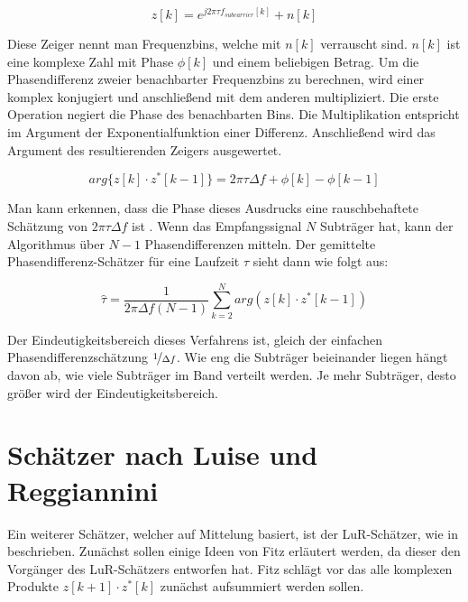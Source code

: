 \begin{equation}
	\label{Frequnzbin}
	z[k] = e^{j2\pi \tau f_{subcarrier}[k]} + n[k]
\end{equation}

Diese Zeiger nennt man Frequenzbins, welche mit $n[k]$ verrauscht sind. $n[k]$ ist eine komplexe Zahl mit Phase $\phi[k]$ und einem beliebigen Betrag. Um die Phasendifferenz zweier benachbarter Frequenzbins zu berechnen, wird einer komplex konjugiert und anschließend mit dem anderen multipliziert. Die erste Operation negiert die Phase des benachbarten Bins. Die Multiplikation entspricht im Argument der Exponentialfunktion einer Differenz. Anschließend wird das Argument des resultierenden Zeigers ausgewertet.

\begin{equation}
	\label{eq:Phasendiff Komplexer Zeiger}
	arg\{z[k]\cdot z^*[k-1]\} = 2 \pi \tau \Delta f + \phi [k] - \phi [k-1]
\end{equation}

Man kann erkennen, dass die Phase dieses Ausdrucks eine rauschbehaftete Schätzung von $2 \pi \tau \Delta f$ ist \cite[S.87]{mengali1997synchronization}. Wenn das Empfangssignal $N$ Subträger hat, kann der Algorithmus über $N - 1$ Phasendifferenzen mitteln. Der gemittelte Phasendifferenz-Schätzer für eine Laufzeit $\tau$ sieht dann wie folgt aus:

\begin{equation}
	\label{eq:gemittelte Phasendifferenz}
	\hat{\tau} = \frac{1}{2\pi \Delta f (N - 1)}\sum_{k = 2}^{N} arg(z[k]\cdot z^*[k-1])
\end{equation}

Der Eindeutigkeitsbereich dieses Verfahrens ist, gleich der einfachen Phasendifferenzschätzung $\nicefrac[]{1}{\Delta f}$. Wie eng die Subträger beieinander liegen hängt davon ab, wie viele Subträger im Band verteilt werden. Je mehr Subträger, desto größer wird der Eindeutigkeitsbereich. 


\section{Schätzer nach Luise und Reggiannini}
\label{chap3.2:LuR}
Ein weiterer Schätzer, welcher auf Mittelung basiert, ist der \gls{LuR}-Schätzer, wie in \cite[S.89]{mengali1997synchronization} beschrieben. Zunächst sollen einige Ideen von Fitz erläutert werden, da dieser den Vorgänger des \gls{LuR}-Schätzers entworfen hat. 
Fitz schlägt vor das alle komplexen Produkte $z[k+1]\cdot z^*[k]$ zunächst aufsummiert werden sollen. 

